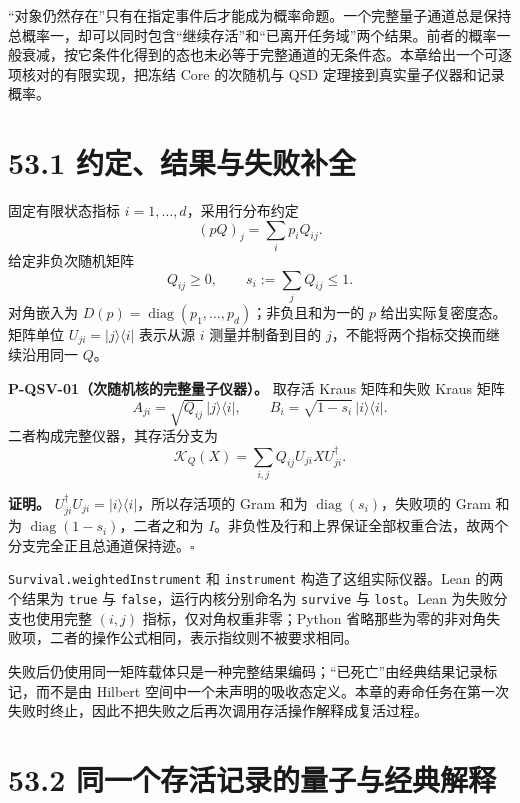 \documentclass[
  11pt,
  oneside]{book}
\begin{document}
``对象仍然存在''只有在指定事件后才能成为概率命题。一个完整量子通道总是保持总概率一，却可以同时包含``继续存活''和``已离开任务域''两个结果。前者的概率一般衰减，按它条件化得到的态也未必等于完整通道的无条件态。本章给出一个可逐项核对的有限实现，把冻结
Core 的次随机与 QSD 定理接到真实量子仪器和记录概率。

\section{53.1 约定、结果与失败补全}

固定有限状态指标 \(i=1,\ldots,d\)，采用行分布约定 \[
(pQ)_j=\sum_i p_iQ_{ij}.
\] 给定非负次随机矩阵 \[
Q_{ij}\ge0,\qquad s_i:=\sum_jQ_{ij}\le1.
\] 对角嵌入为
\(D(p)=\operatorname{diag}(p_1,\ldots,p_d)\)；非负且和为一的 \(p\)
给出实际复密度态。矩阵单位 \(U_{ji}=|j\rangle\langle i|\) 表示从源 \(i\)
测量并制备到目的 \(j\)，不能将两个指标交换而继续沿用同一 \(Q\)。

\protect\hypertarget{p-qsv-01}{}{}

\textbf{P-QSV-01（次随机核的完整量子仪器）。} 取存活 Kraus 矩阵和失败
Kraus 矩阵 \[
A_{ji}=\sqrt{Q_{ij}}\,|j\rangle\langle i|,
\qquad B_i=\sqrt{1-s_i}\,|i\rangle\langle i|.
\] 二者构成完整仪器，其存活分支为 \[
\mathcal K_Q(X)=\sum_{i,j}Q_{ij}U_{ji}XU_{ji}^{\dagger}.
\]

\textbf{证明。}
\(U_{ji}^{\dagger}U_{ji}=|i\rangle\langle i|\)，所以存活项的 Gram 和为
\(\operatorname{diag}(s_i)\)，失败项的 Gram 和为
\(\operatorname{diag}(1-s_i)\)，二者之和为
\(I\)。非负性及行和上界保证全部权重合法，故两个分支完全正且总通道保持迹。\(\square\)

\texttt{Survival.\allowbreak weighted\allowbreak Instrument} 和 \texttt{instrument}
构造了这组实际仪器。Lean 的两个结果为 \texttt{true} 与
\texttt{false}，运行内核分别命名为 \texttt{survive} 与
\texttt{lost}。Lean 为失败分支也使用完整 \((i,j)\)
指标，仅对角权重非零；Python
省略那些为零的非对角失败项，二者的操作公式相同，表示指纹则不被要求相同。

失败后仍使用同一矩阵载体只是一种完整结果编码；``已死亡''由经典结果记录标记，而不是由
Hilbert
空间中一个未声明的吸收态定义。本章的寿命任务在第一次失败时终止，因此不把失败之后再次调用存活操作解释成复活过程。

\section{53.2 同一个存活记录的量子与经典解释}

\protect\hypertarget{p-qsv-02}{}{}
\end{document}
